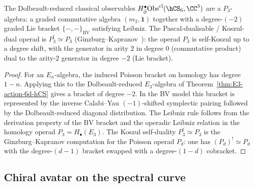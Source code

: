 \begin{theorem}
\label{thm:P3-obs-6d-hCS}
The Dolbeault-reduced classical observables
$H^\bullet_{\bar\partial}\mathrm{Obs}^{\mathrm{cl}}(\hCS_6,\CC^3)$
are a $P_3$-algebra:
a graded commutative algebra $(m_2, \mathbf{1})$ together with a
degree-$(-2)$ graded Lie bracket $\{-,-\}_{\mathrm{BV}}$
satisfying Leibniz. The Pascal-dualisable / Koszul-dual operad is
$P_3^!\simeq P_3$ (Ginzburg--Kapranov~\cite{GK94}): the operad
$P_3$ is self-Koszul up to a degree shift, with the generator in arity
$2$ in degree $0$ (commutative product) dual to the arity-$2$ generator
in degree $-2$ (Lie bracket).
\end{theorem}

\begin{proof}
For an \(E_n\)-algebra, the induced Poisson bracket on homology has
degree \(1-n\).  Applying this to the Dolbeault-reduced \(E_3\)-algebra
of Theorem~\ref{thm:E3-action-6d-hCS} gives a bracket of degree
\(-2\).  In the BV model this bracket is represented by the inverse
Calabi--Yau \((-1)\)-shifted symplectic pairing followed by the
Dolbeault-reduced diagonal distribution.  The Leibniz rule follows from
the derivation property of the BV bracket and the operadic
Leibniz relation in the homology operad \(P_3=H_\bullet(E_3)\).
The Koszul self-duality $P_3^!\simeq P_3$ is the Ginzburg--Kapranov
computation for the Poisson operad $P_d$: one has
$(P_d)^!\simeq P_{d}$ with the degree-$(d-1)$ bracket swapped with a
degree-$(1-d)$ cobracket.
\end{proof}

\subsection{Chiral avatar on the spectral curve}
\label{subsec:E3-chiral-avatar}

